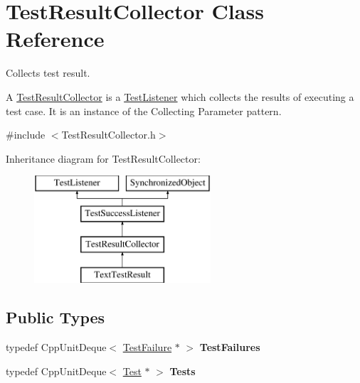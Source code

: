 \hypertarget{class_test_result_collector}{}\section{Test\+Result\+Collector Class Reference}
\label{class_test_result_collector}


Collects test result.

A \hyperlink{class_test_result_collector}{Test\+Result\+Collector} is a \hyperlink{class_test_listener}{Test\+Listener} which collects the results of executing a test case. It is an instance of the Collecting Parameter pattern.  




{\ttfamily \#include $<$Test\+Result\+Collector.\+h$>$}

Inheritance diagram for Test\+Result\+Collector\+:\begin{figure}[H]
\begin{center}
\leavevmode
\includegraphics[height=4.000000cm]{class_test_result_collector}
\end{center}
\end{figure}
\subsection*{Public Types}
\begin{DoxyCompactItemize}
\item 
typedef Cpp\+Unit\+Deque$<$ \hyperlink{class_test_failure}{Test\+Failure} $\ast$ $>$ {\bfseries Test\+Failures}\hypertarget{class_test_result_collector_a8ae051e883095aee10d9f777664fe8af}{}\label{class_test_result_collector_a8ae051e883095aee10d9f777664fe8af}

\item 
typedef Cpp\+Unit\+Deque$<$ \hyperlink{class_test}{Test} $\ast$ $>$ {\bfseries Tests}\hypertarget{class_test_result_collector_a6ab73f8a52311857afa98a1ef049e30a}{}\label{class_test_result_collector_a6ab73f8a52311857afa98a1ef049e30a}

\end{DoxyCompactItemize}
